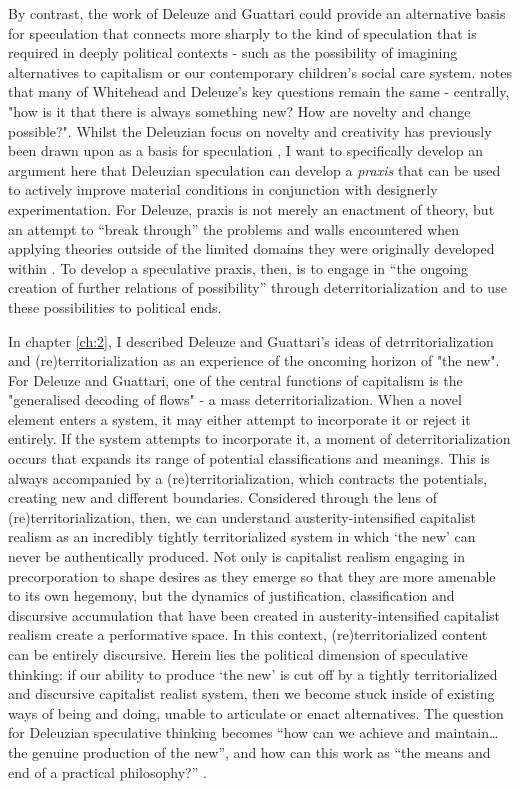 By contrast, the work of Deleuze and Guattari could provide an alternative basis for speculation that connects more sharply to the kind of speculation that is required in deeply political contexts - such as the possibility of imagining alternatives to capitalism or our contemporary children's social care system. \citet[23]{shaviro_deleuzes_2007} notes that many of Whitehead and Deleuze's key questions remain the same - centrally, "how is it that there is always something new? How are novelty and change possible?". Whilst the Deleuzian focus on novelty and creativity has previously been drawn upon as a basis for speculation \citep{savransky_developing_2017}, I want to specifically develop an argument here that Deleuzian speculation can develop a \textit{praxis} that can be used to actively improve material conditions in conjunction with designerly experimentation. For Deleuze, praxis is not merely an enactment of theory, but an attempt to “break through” the problems and walls encountered when applying theories outside of the limited domains they were originally developed within \citep[206]{deleuze_desert_2004}. To develop a speculative praxis, then, is to engage in “the ongoing creation of further relations of possibility” through deterritorialization \citep[365]{harrison_future_2020} and to use these possibilities to political ends.

In chapter \ref{ch:2}, I described Deleuze and Guattari's ideas of detrritorialization and (re)territorialization as an experience of the oncoming horizon of "the new". For Deleuze and Guattari, one of the central functions of capitalism is the "generalised decoding of flows" \citep[153]{deleuze_anti-oedipus:_1983} - a mass deterritorialization. When a novel element enters a system, it may either attempt to incorporate it or reject it entirely. If the system attempts to incorporate it, a moment of deterritorialization occurs that expands its range of potential classifications and meanings. This is always accompanied by a (re)territorialization, which contracts the potentials, creating new and different boundaries. Considered through the lens of (re)territorialization, then, we can understand austerity-intensified capitalist realism as an incredibly tightly territorialized system in which ‘the new’ can never be authentically produced. Not only is capitalist realism engaging in precorporation to shape desires as they emerge so that they are more amenable to its own hegemony, but the dynamics of justification, classification and discursive accumulation that have been created in austerity-intensified capitalist realism create a performative space. In this context, (re)territorialized content can be entirely discursive. Herein lies the political dimension of speculative thinking: if our ability to produce ‘the new’ is cut off by a tightly territorialized and discursive capitalist realist system, then we become stuck inside of existing ways of being and doing, unable to articulate or enact alternatives. The question for Deleuzian speculative thinking becomes “how can we achieve and maintain… the genuine production of the new”, and how can this work as “the means and end of a practical philosophy?” \citep[2]{osullivan_deleuze_2008}. 

